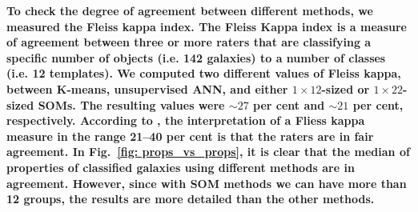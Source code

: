         
        
        \textbf{To check the degree of agreement between different methods, we measured the Fleiss kappa index. 
        The Fleiss Kappa index is a measure of agreement between three or more raters that are classifying a specific number of objects (i.e. 142 galaxies) to a number of classes (i.e. 12 templates).
        We computed two different values of Fleiss kappa, between  K-means, unsupervised ANN, and either 
         $1\times12$-sized or $1\times22$-sized SOMs.
        The resulting values were $\sim 27$ per cent and $\sim 21$ per cent, respectively.
        According to \citet{landis77}, the interpretation of a Fliess kappa measure in the range 21--40 per cent is that the raters are in fair agreement.
        In Fig.~\ref{fig: props_vs_props}, it is clear that the median of properties of classified galaxies using different methods are in agreement. 
        However, since with SOM methods we can have more than 12 groups, the results are more detailed than the other methods.} 

